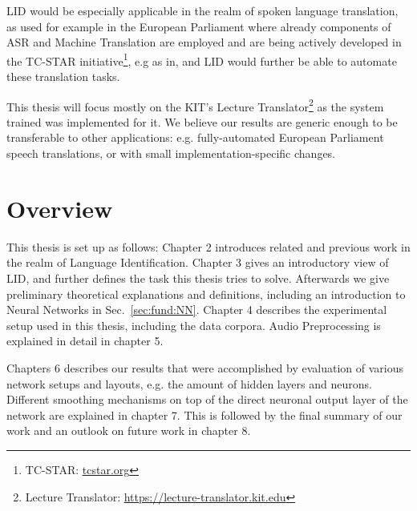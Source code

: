 LID would be especially applicable in the realm of spoken language translation, as used for example in the European Parliament where already components of ASR and Machine Translation are employed and are being actively developed in the TC-STAR initiative\footnote{TC-STAR: \url{tcstar.org}}, e.g as in\cite{vilar2005statistical}, and LID would further be able to automate these translation tasks.

This thesis will focus mostly on the KIT's Lecture Translator\footnote{Lecture Translator: \url{https://lecture-translator.kit.edu}}  as the system trained was implemented for it. We believe our results are generic enough to be transferable to other applications: e.g. fully-automated European Parliament speech translations, or  with small implementation-specific changes.

\section{Overview}
\label{sec:Intro:Overview}

This thesis is set up as follows: Chapter 2 introduces related and previous work in the realm of Language Identification. Chapter 3 gives an introductory view of LID, and further defines the task this thesis tries to solve. Afterwards we give preliminary theoretical explanations and definitions, including an introduction to Neural Networks in Sec.~\ref{sec:fund:NN}. Chapter 4 describes the experimental setup used in this thesis, including the data corpora. Audio Preprocessing is explained in detail in chapter 5.

Chapters 6 describes our results that were accomplished by evaluation of various network setups and layouts, e.g. the amount of hidden layers and neurons. Different smoothing mechanisms on top of the direct neuronal output layer of the network are explained in chapter 7. This is followed by the final summary of our work and an outlook on future work in chapter 8.